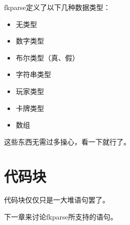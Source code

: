 fkparse定义了以下几种数据类型：

\begin{itemize}
 \item 无类型
 \item 数字类型
 \item 布尔类型（真、假）
 \item 字符串类型
 \item 玩家类型
 \item 卡牌类型
 \item 数组
\end{itemize}

这些东西无需过多操心，看一下就行了。

\section{代码块}

代码块仅仅只是一大堆语句罢了。

下一章来讨论fkparse所支持的语句。


